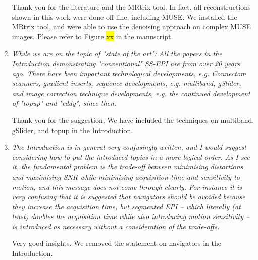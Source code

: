 \documentclass[a4paper,11pt,twoside]{report}
\begin{document}
\begin{enumerate}
    \hspace{1em} Thank you for the literature and the MRtrix tool.
    In fact, all reconstructions shown in this work were done off-line,
    including MUSE.
    We installed the MRtrix tool, and were able to use
    the denoising approach on complex MUSE images.
    Please refer to Figure \hl{xx} in the manuscript.

%

    \item \textit{While we are on the topic of "state of the art": All the papers in the Introduction demonstrating "conventional" SS-EPI are from over 20 years ago. There have been important technological developments, e.g. Connectom scanners, gradient inserts, sequence developments, e.g. multiband, gSlider, and image correction technique developments, e.g. the continued development of "topup" and "eddy", since then.}

    \hspace{1em} Thank you for the suggestion.
    We have included the techniques on multiband, gSlider, and topup
    in the Introduction.

    \item \textit{The Introduction is in general very confusingly written, and I would suggest considering how to put the introduced topics in a more logical order. As I see it, the fundamental problem is the trade-off between minimising distortions and maximising SNR while minimising acquisition time and sensitivity to motion, and this message does not come through clearly. For instance it is very confusing that it is suggested that navigators should be avoided because they increase the acquisition time, but segmented EPI -- which literally (at least) doubles the acquisition time while also introducing motion sensitivity -- is introduced as necessary without a consideration of the trade-offs.}

    \hspace{1em} Very good insights.
    We removed the statement on navigators in the Introduction.


\end{enumerate}
\end{document}
